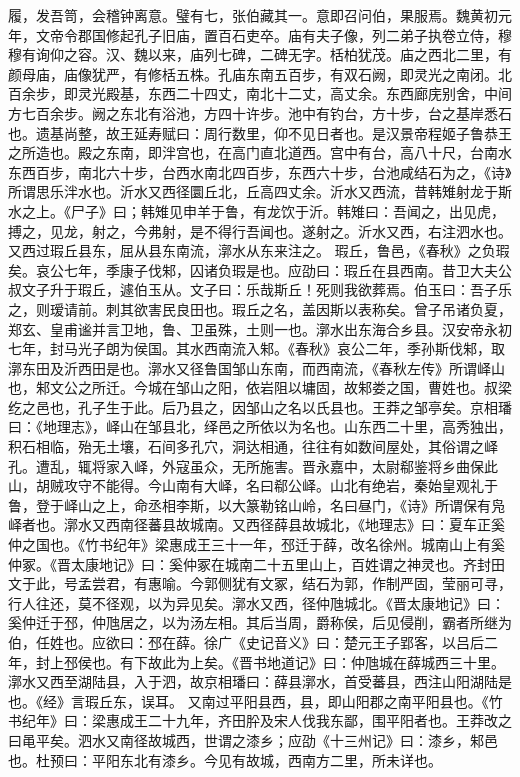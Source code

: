 \documentclass[12pt,UTF8]{ctexbook}
\begin{document}
履，发吾笥，会稽钟离意。璧有七，张伯藏其一。意即召问伯，果服焉。魏黄初元年，文帝令郡国修起孔子旧庙，置百石吏卒。庙有夫子像，列二弟子执卷立侍，穆穆有询仰之容。汉、魏以来，庙列七碑，二碑无字。栝柏犹茂。庙之西北二里，有颜母庙，庙像犹严，有修栝五株。孔庙东南五百步，有双石阙，即灵光之南闭。北百余步，即灵光殿基，东西二十四丈，南北十二丈，高丈余。东西廊庑别舍，中间方七百余步。阙之东北有浴池，方四十许步。池中有钓台，方十步，台之基岸悉石也。遗基尚整，故王延寿赋曰：周行数里，仰不见日者也。是汉景帝程姬子鲁恭王之所造也。殿之东南，即泮宫也，在高门直北道西。宫中有台，高八十尺，台南水东西百步，南北六十步，台西水南北四百步，东西六十步，台池咸结石为之，《诗》所谓思乐泮水也。沂水又西径圜丘北，丘高四丈余。沂水又西流，昔韩雉射龙于斯水之上。《尸子》曰；韩雉见申羊于鲁，有龙饮于沂。韩雉曰：吾闻之，出见虎，搏之，见龙，射之，今弗射，是不得行吾闻也。遂射之。沂水又西，右注泗水也。
又西过瑕丘县东，屈从县东南流，漷水从东来注之。
瑕丘，鲁邑，《春秋》之负瑕矣。哀公七年，季康子伐邾，囚诸负瑕是也。应劭曰：瑕丘在县西南。昔卫大夫公叔文子升于瑕丘，遽伯玉从。文子曰：乐哉斯丘！死则我欲葬焉。伯玉曰：吾子乐之，则瑷请前。刺其欲害民良田也。瑕丘之名，盖因斯以表称矣。曾子吊诸负夏，郑玄、皇甫谧并言卫地，鲁、卫虽殊，土则一也。漷水出东海合乡县。汉安帝永初七年，封马光子朗为侯国。其水西南流入邾。《春秋》哀公二年，季孙斯伐邾，取漷东田及沂西田是也。漷水又径鲁国邹山东南，而西南流，《春秋左传》所谓峄山也，邾文公之所迁。今城在邹山之阳，依岩阻以墉固，故邾娄之国，曹姓也。叔梁纥之邑也，孔子生于此。后乃县之，因邹山之名以氏县也。王莽之邹亭矣。京相璠曰：《地理志》，峄山在邹县北，绎邑之所依以为名也。山东西二十里，高秀独出，积石相临，殆无土壤，石间多孔穴，洞达相通，往往有如数间屋处，其俗谓之峄孔。遭乱，辄将家入峄，外寇虽众，无所施害。晋永嘉中，太尉郗鉴将乡曲保此山，胡贼攻守不能得。今山南有大峄，名曰郗公峄。山北有绝岩，秦始皇观礼于鲁，登于峄山之上，命丞相李斯，以大篆勒铭山岭，名曰昼门，《诗》所谓保有凫峄者也。漷水又西南径蕃县故城南。又西径薛县故城北，《地理志》曰：夏车正奚仲之国也。《竹书纪年》梁惠成王三十一年，邳迁于薛，改名徐州。城南山上有奚仲冢。《晋太康地记》曰：奚仲冢在城南二十五里山上，百姓谓之神灵也。齐封田文于此，号孟尝君，有惠喻。今郭侧犹有文冢，结石为郭，作制严固，莹丽可寻，行人往还，莫不径观，以为异见矣。漷水又西，径仲虺城北。《晋太康地记》曰：奚仲迁于邳，仲虺居之，以为汤左相。其后当周，爵称侯，后见侵削，霸者所继为伯，任姓也。应欲曰：邳在薛。徐广《史记音义》曰：楚元王子郢客，以吕后二年，封上邳侯也。有下故此为上矣。《晋书地道记》曰：仲虺城在薛城西三十里。漷水又西至湖陆县，入于泗，故京相璠曰：薛县漷水，首受蕃县，西注山阳湖陆是也。《经》言瑕丘东，误耳。
又南过平阳县西，县，即山阳郡之南平阳县也。《竹书纪年》曰：梁惠成王二十九年，齐田肸及宋人伐我东鄙，围平阳者也。王莽改之曰黾平矣。泗水又南径故城西，世谓之漆乡；应劭《十三州记》曰：漆乡，邾邑也。杜预曰：平阳东北有漆乡。今见有故城，西南方二里，所未详也。
\end{document}
